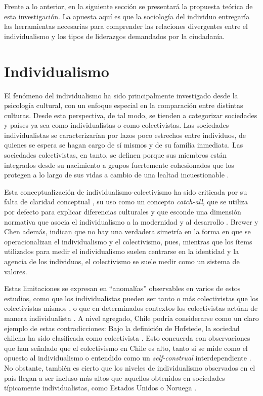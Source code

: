 \documentclass[12pt,oneside]{templates/facsothesis}
\begin{document}
Frente a lo anterior, en la siguiente sección se presentará la propuesta teórica de esta investigación. La apuesta aquí es que la sociología del individuo entregaría las herramientas necesarias para comprender las relaciones divergentes entre el individualismo y los tipos de liderazgos demandados por la ciudadanía.

\hypertarget{individualismo}{%
\section*{Individualismo}\label{individualismo}}

El fenómeno del individualismo ha sido principalmente investigado desde la psicología cultural, con un enfoque especial en la comparación entre distintas culturas. Desde esta perspectiva, de tal modo, se tienden a categorizar sociedades y países ya sea como individualistas o como colectivistas. Las sociedades individualistas se caracterizarían por lazos poco estrechos entre individuos, de quienes se espera se hagan cargo de sí mismos y de su familia inmediata. Las sociedades colectivistas, en tanto, se definen porque sus miembros están integrados desde su nacimiento a grupos fuertemente cohesionados que los protegen a lo largo de sus vidas a cambio de una lealtad incuestionable \citep{yoon2010}.

Esta conceptualización de individualismo-colectivismo ha sido criticada por su falta de claridad conceptual \citep{oyserman2002}, su uso como un concepto \emph{catch-all}, que se utiliza por defecto para explicar diferencias culturales \citep{voronov2002} y que esconde una dimensión normativa que asocia el individualismo a la modernidad y al desarrollo \citep{voronov2002, wang2010, martuccelli2010, moemeka1998}. Brewer y Chen \citeyearpar{brewer2007} además, indican que no hay una verdadera simetría en la forma en que se operacionalizan el individualismo y el colectivismo, pues, mientras que los ítems utilizados para medir el individualismo suelen centrarse en la identidad y la agencia de los individuos, el colectivismo se suele medir como un sistema de valores.

Estas limitaciones se expresan en ``anomalías'' observables en varios de estos estudios, como que los individualistas pueden ser tanto o más colectivistas que los colectivistas mismos \citep{oyserman2002}, o que en determinados contextos los colectivistas actúan de manera individualista \citep{voronov2002}. A nivel agregado, Chile podría considerarse como un claro ejemplo de estas contradicciones: Bajo la definición de Hofstede, la sociedad chilena ha sido clasificada como colectivista \citep{rojas2008}. Esto concuerda con observaciones que han señalado que el colectivismo en Chile es alto, tanto si se mide como el opuesto al individualismo \citep{oyserman2002} o entendido como un \emph{self-construal} interdependiente \citep{benavides2020}. No obstante, también es cierto que los niveles de individualismo observados en el país llegan a ser incluso más altos que aquellos obtenidos en sociedades típicamente individualistas, como Estados Unidos \citep{oyserman2002} o Noruega \citep{kolstad2009}.
\end{document}

